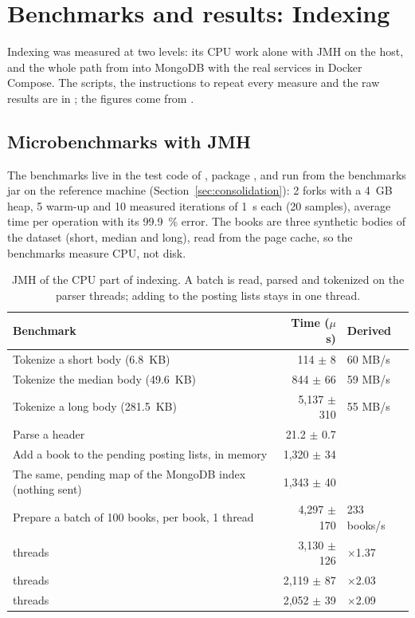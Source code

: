 \section{Benchmarks and results: Indexing}
\label{sec:benchmarks-indexing}

Indexing was measured at two levels: its CPU work alone with JMH on the host, and the whole path from
 into MongoDB with the real services in Docker Compose. The scripts, the instructions to repeat every
measure and the raw results are in ; the figures come from .

\subsection{Microbenchmarks with JMH}

The benchmarks live in the test code of , package , and run from the
benchmarks jar on the reference machine (Section~\ref{sec:consolidation}): 2 forks with a 4~GB heap, 5 warm-up and 10
measured iterations of 1~s each (20 samples), average time per operation with its 99.9~\% error. The books are three synthetic bodies of the dataset (short, median
and long), read from the page cache, so the benchmarks measure CPU, not disk.

\begin{table}[H]
\centering\small
\begin{tabularx}{\linewidth}{@{}Xrl@{}}
\toprule
\textbf{Benchmark} & \textbf{Time ($\mu$s)} & \textbf{Derived} \\
\midrule
Tokenize a short body (6.8~KB) & 114 $\pm$ 8 & 60 MB/s \\
Tokenize the median body (49.6~KB) & 844 $\pm$ 66 & 59 MB/s \\
Tokenize a long body (281.5~KB) & 5,137 $\pm$ 310 & 55 MB/s \\
Parse a header & 21.2 $\pm$ 0.7 & \\
Add a book to the pending posting lists, in memory & 1,320 $\pm$ 34 & \\
The same, pending map of the MongoDB index (nothing sent) & 1,343 $\pm$ 40 & \\
Prepare a batch of 100 books, per book, 1 thread & 4,297 $\pm$ 170 & 233 books/s \\
\quad 2 threads & 3,130 $\pm$ 126 & $\times$1.37 \\
\quad 4 threads & 2,119 $\pm$ 87 & $\times$2.03 \\
\quad 8 threads & 2,052 $\pm$ 39 & $\times$2.09 \\
\bottomrule
\end{tabularx}
\caption{JMH of the CPU part of indexing. A batch is read, parsed and tokenized on the parser threads; adding to the
posting lists stays in one thread.}
\label{tab:jmh-indexing}
\end{table}

